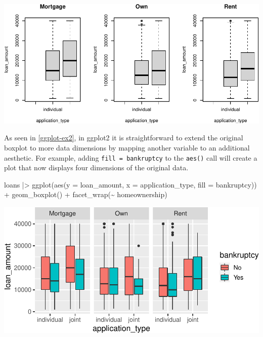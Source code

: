 \documentclass[12pt]{article}
\newenvironment{Shaded}{\begin{snugshade}}{\end{snugshade}}
\newcommand{\AttributeTok}[1]{\textcolor[rgb]{0.77,0.63,0.00}{#1}}
\newcommand{\FunctionTok}[1]{\textcolor[rgb]{0.00,0.00,0.00}{#1}}
\newcommand{\NormalTok}[1]{#1}
\newcommand{\SpecialCharTok}[1]{\textcolor[rgb]{0.00,0.00,0.00}{#1}}
\begin{document}
\begin{center}\includegraphics[width=0.8\linewidth]{educators-perspective-tidyverse_files/figure-latex/base_plot_ex-1} \end{center}

\label{base-plot-ex} \linespread{2}
\vspace{3mm}\setlength{\parindent}{15pt}

As seen in \ref{ggplot-ex2}, in ggplot2 it is straightforward to extend
the original boxplot to more data dimensions by mapping another variable
to an additional aesthetic. For example, adding
\texttt{fill\ =\ bankruptcy} to the \texttt{aes()} call will create a
plot that now displays four dimensions of the original data.

\linespread{1}

\begin{Shaded}
\begin{Highlighting}[]
\NormalTok{loans }\SpecialCharTok{|\textgreater{}}
  \FunctionTok{ggplot}\NormalTok{(}\FunctionTok{aes}\NormalTok{(}\AttributeTok{y =}\NormalTok{ loan\_amount, }\AttributeTok{x =}\NormalTok{ application\_type, }\AttributeTok{fill =}\NormalTok{ bankruptcy)) }\SpecialCharTok{+}
  \FunctionTok{geom\_boxplot}\NormalTok{() }\SpecialCharTok{+}
  \FunctionTok{facet\_wrap}\NormalTok{(}\SpecialCharTok{\textasciitilde{}}\NormalTok{ homeownership)}
\end{Highlighting}
\end{Shaded}

\begin{center}\includegraphics[width=0.9\linewidth]{educators-perspective-tidyverse_files/figure-latex/ggplot_ex2-1} \end{center}
\end{document}
